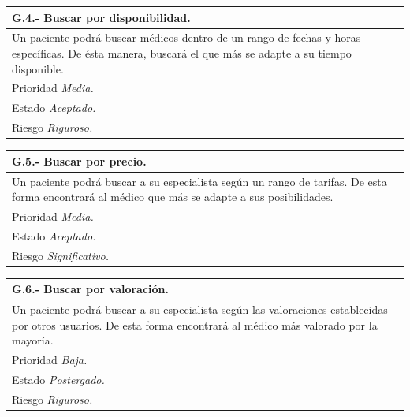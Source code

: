 \documentclass[a4paper,oneside,11pt]{book}
\begin{document}
\begin{center}
\begin{tabulary}{15cm}{|L|}
	\hline
		\bf{G.4.- Buscar por disponibilidad.} \\
	\hline
		Un paciente podrá buscar médicos dentro de un rango de fechas y horas específicas. De ésta manera, buscará el que más se adapte a su tiempo disponible. \\
	\hline
		Prioridad \textit{Media.} \\
	\hline
		Estado \textit{Aceptado.} \\
	\hline
		Riesgo \textit{Riguroso.} \\
	\hline
\end{tabulary}
\end{center}

\begin{center}
\begin{tabulary}{15cm}{|L|}
	\hline
		\bf{G.5.- Buscar por precio.} \\
	\hline
		Un paciente podrá buscar a su especialista según un rango de tarifas. De esta forma encontrará al médico que más se adapte a sus posibilidades. \\
	\hline
		Prioridad \textit{Media.} \\
	\hline
		Estado \textit{Aceptado.} \\
	\hline
		Riesgo \textit{Significativo.} \\
	\hline
\end{tabulary}
\end{center}

\begin{center}
\begin{tabulary}{15cm}{|L|}
	\hline
		\bf{G.6.- Buscar por valoración.} \\
	\hline
		Un paciente podrá buscar a su especialista según las valoraciones establecidas por otros usuarios. De esta forma encontrará al médico más valorado por la mayoría. \\
	\hline
		Prioridad \textit{Baja.} \\
	\hline
		Estado \textit{Postergado.} \\
	\hline
		Riesgo \textit{Riguroso.} \\
	\hline
\end{tabulary}
\end{center}
\end{document}
